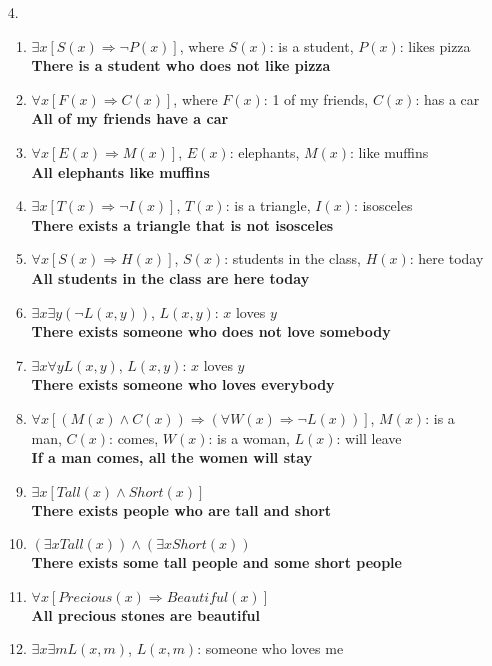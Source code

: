 \documentclass[11pt]{exam}
\begin{document}
\begin{enumerate}[leftmargin=0pt]
\item[4.]
\begin{enumerate}[label=(\alph*)]
    \item $\exists x [S(x) \Rightarrow \neg P(x)]$, where $S(x)$: is a student, $P(x)$: likes pizza \\
    \textbf{There is a student who does not like pizza}
    \item $\forall x [F(x) \Rightarrow C(x)]$, where $F(x)$: 1 of my friends, $C(x)$: has a car \\
    \textbf{All of my friends have a car}
    \item $\forall x [E(x) \Rightarrow M(x)]$, $E(x)$: elephants, $M(x)$: like muffins \\
    \textbf{All elephants like muffins}
    \item $\exists x [T(x) \Rightarrow \neg I(x)]$, $T(x)$: is a triangle, $I(x)$: isosceles \\
    \textbf{There exists a triangle that is not isosceles}
    \item $\forall x [S(x) \Rightarrow H(x)]$, $S(x)$: students in the class, $H(x)$: here today \\
    \textbf{All students in the class are here today}
    \item $\exists x \exists y (\neg L(x,y))$, $L(x,y)$: $x$ loves $y$ \\
    \textbf{There exists someone who does not love somebody}
    \item $\exists x \forall y L(x,y)$, $L(x,y)$: $x$ loves $y$ \\
    \textbf{There exists someone who loves everybody}
    \item $\forall x [(M(x) \land C(x)) \Rightarrow (\forall W(x) \Rightarrow \neg L(x))]$, $M(x)$: is a man, $C(x)$: comes, $W(x)$: is a woman, $L(x)$: will leave \\
    \textbf{If a man comes, all the women will stay}
    \item $\exists x [ Tall(x) \land Short(x)]$ \\
    \textbf{There exists people who are tall and short}
    \item $(\exists x Tall(x)) \land (\exists x Short(x))$ \\
    \textbf{There exists some tall people and some short people}
    \item $\forall x [Precious(x) \Rightarrow Beautiful(x)]$ \\
    \textbf{All precious stones are beautiful}
    \item $\exists x \exists m L(x,m)$, $L(x,m)$: someone who loves me \\

\end{enumerate}
\end{enumerate}
\end{document}
